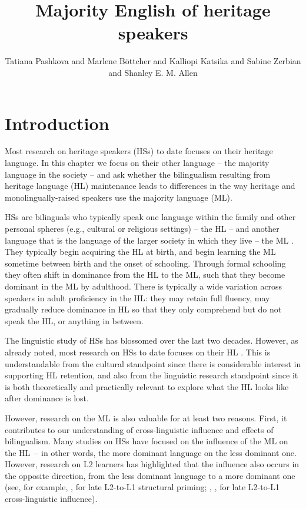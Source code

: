 \documentclass[output=paper,colorlinks,citecolor=brown]{langscibook}
\author{Tatiana Pashkova\orcid{0000-0002-6676-9555}\affiliation{University of Kaiserslautern-Landau}  and  Marlene Böttcher\orcid{0009-0000-7538-2902}\affiliation{Kiel University}  and  Kalliopi Katsika\orcid{0000-0002-6736-4963}\affiliation{University of Kaiserslautern-Landau}  and  Sabine Zerbian\orcid{0000-0002-4631-369X}\affiliation{University of Stuttgart} and Shanley E. M. Allen\orcid{0000-0002-5421-6750}\affiliation{University of Kaiserslautern-Landau}
}
\title{Majority English of heritage speakers}
\begin{document}
\maketitle

\section{Introduction} \label{sec:pashkovaetal:Intro}

Most research on heritage speakers (HSs) to date focuses on their heritage language. In this chapter we focus on their other language – the majority language in the society – and ask whether the bilingualism resulting from heritage language (HL) maintenance leads to differences in the way heritage and monolingually\hyp raised speakers use the majority language (ML).

HSs  are bilinguals who typically speak one language within the family and other personal spheres (e.g., cultural or religious settings) – the HL – and another language that is the language of the larger society in which they live – the ML \parencite{pascualycabo2012, Montrul2016, MontrulPolinsky2021}. They typically begin acquiring the HL at birth, and begin learning the ML sometime between birth and the onset of schooling. Through formal schooling they often shift in dominance from the HL to the ML, such that they become dominant in the ML by adulthood. There is typically a wide variation across speakers in adult proficiency in the HL: they may retain full fluency, may gradually reduce dominance in HL so that they only comprehend but do not speak the HL, or anything in between.

The linguistic study of HSs has blossomed over the last two decades. However, as already noted, most research on HSs to date focuses on their HL \parencite{Montrul2008, Kupisch2013, Montrul2016, Polinsky2018book, MontrulPolinsky2021}. This is understandable from the cultural standpoint since there is considerable interest in supporting HL retention, and also from the linguistic research standpoint since it is both theoretically and practically relevant to explore what the HL looks like after dominance is lost. 

However, research on the ML is also valuable for at least two reasons. First, it contributes to our understanding of cross-linguistic influence and effects of bilingualism. Many studies on HSs have focused on the influence of the ML on the HL~-- in other words, the more dominant language on the less dominant one. 
However, research on L2 learners has highlighted that the influence also occurs in the opposite direction, from the less dominant language to a more dominant one (see, for example, \cite{Schoonbaert2007}, \cite{Chen2013} for late L2-to-L1 structural priming; \cite{Pavlenko2002}, \cite{Hohenstein2006}, \cite{Gorba2019} for late L2-to-L1 cross-linguistic influence).
\end{document}

